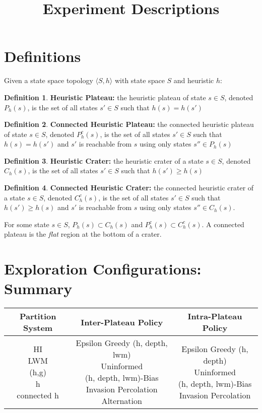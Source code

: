 \documentclass{article}
\title{Experiment Descriptions}
\author{}
\date{}
\theoremstyle{definition}
\newtheorem{definition}{Definition}[section]
\begin{document}
\maketitle
\pagestyle{plain}

\section{Definitions}
Given a state space topology $\langle S, h \rangle$ with state space $S$ and heuristic $h$: 
\begin{definition}
    \textbf{Heuristic Plateau:} the heuristic plateau of state $s \in S$, denoted $P_h(s)$, is the set of all states $s' \in S$ such that $h(s) = h(s')$
\end{definition}

\begin{definition}
    \textbf{Connected Heuristic Plateau:} the connected heuristic plateau of state $s \in S$, denoted $P^c_h(s)$, is the set of all states $s' \in S$ such that $h(s) = h(s')$ and $s'$ is reachable from $s$ using only states $s'' \in P_h(s)$
\end{definition}

\begin{definition}
    \textbf{Heuristic Crater:} the  heuristic crater of a state $s \in S$, denoted $C_h(s)$, is the set of all states $s' \in S$ such that $h(s') \geq h(s)$
\end{definition}

\begin{definition}
    \textbf{Connected Heuristic Crater:} the connected heuristic crater of a state $s \in S$, denoted $C^c_h(s)$, is the set of all states $s' \in S$ such that $h(s') \geq h(s)$ and $s'$ is reachable from $s$ using only states $s'' \in C_h(s)$. 
\end{definition}

For some state $s \in S$, $P_h(s) \subset C_h(s)$ and $P^c_h(s) \subset C^c_h(s)$. A connected plateau is the \textit{flat} region at the bottom of a crater. 

\section{Exploration Configurations: Summary}
\begin{tabular}{ | c | c | c | } 
    \hline
    Partition System & Inter-Plateau Policy & Intra-Plateau Policy \\
    \hline
    \makecell{HI\\LWM\\(h,g)\\h\\connected h}& \makecell{Epsilon Greedy (h, depth, lwm)\\Uninformed\\(h, depth, lwm)-Bias\\Invasion Percolation\\Alternation} & \makecell{Epsilon Greedy (h, depth)\\Uninformed\\(h, depth, lwm)-Bias\\Invasion Percolation} \\ 
    \hline
\end{tabular}
\end{document}
